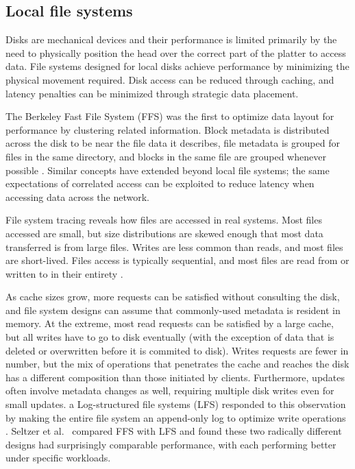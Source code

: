 \subsection{Local file systems}

Disks are mechanical devices and their performance is limited primarily by the need to physically position the head over the correct part of the platter to access data. File systems designed for local disks achieve performance by minimizing the physical movement required. Disk access can be reduced through caching, and latency penalties can be minimized through strategic data placement.

The Berkeley Fast File System (FFS) was the first to optimize data layout for performance by clustering related information. Block metadata is distributed across the disk to be near the file data it describes, file metadata is grouped for files in the same directory, and blocks in the same file are grouped whenever possible \cite{mckusick}. Similar concepts have extended beyond local file systems; the same expectations of correlated access can be exploited to reduce latency when accessing data across the network.

File system tracing reveals how files are accessed in real systems. Most files accessed are small, but size distributions are skewed enough that most data transferred is from large files. Writes are less common than reads, and most files are short-lived. Files access is typically sequential, and most files are read from or written to in their entirety \cite{ousterhout,ruemmler,gibson98b}.

As cache sizes grow, more requests can be satisfied without consulting the disk, and file system designs can assume that commonly-used metadata is resident in memory. At the extreme, most read requests can be satisfied by a large cache, but all writes have to go to disk eventually (with the exception of data that is deleted or overwritten before it is commited to disk). Writes requests are fewer in number, but the mix of operations that penetrates the cache and reaches the disk has a different composition than those initiated by clients. Furthermore, updates often involve metadata changes as well, requiring multiple disk writes even for small updates. a Log-structured file systems (LFS) responded to this observation by making the entire file system an append-only log to optimize write operations \cite{rosenblum}. Seltzer et al.\ \cite{seltzer} compared FFS with LFS and found these two radically different designs had surprisingly comparable performance, with each performing better under specific workloads.

